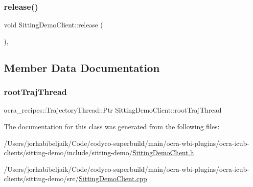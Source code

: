 \subsubsection{\texorpdfstring{release()}{release()}}
{\footnotesize\ttfamily void Sitting\+Demo\+Client\+::release (\begin{DoxyParamCaption}{ }\end{DoxyParamCaption})\hspace{0.3cm}{\ttfamily [protected]}, {\ttfamily [virtual]}}



\subsection{Member Data Documentation}
\hypertarget{classSittingDemoClient_a1d5616269e9a673022542bb86f380bfd}{}\label{classSittingDemoClient_a1d5616269e9a673022542bb86f380bfd} 
\subsubsection{\texorpdfstring{root\+Traj\+Thread}{rootTrajThread}}
{\footnotesize\ttfamily ocra\+\_\+recipes\+::\+Trajectory\+Thread\+::\+Ptr Sitting\+Demo\+Client\+::root\+Traj\+Thread\hspace{0.3cm}{\ttfamily [private]}}



The documentation for this class was generated from the following files\+:\begin{DoxyCompactItemize}
\item 
/\+Users/jorhabibeljaik/\+Code/codyco-\/superbuild/main/ocra-\/wbi-\/plugins/ocra-\/icub-\/clients/sitting-\/demo/include/sitting-\/demo/\hyperlink{SittingDemoClient_8h}{Sitting\+Demo\+Client.\+h}\item 
/\+Users/jorhabibeljaik/\+Code/codyco-\/superbuild/main/ocra-\/wbi-\/plugins/ocra-\/icub-\/clients/sitting-\/demo/src/\hyperlink{SittingDemoClient_8cpp}{Sitting\+Demo\+Client.\+cpp}\end{DoxyCompactItemize}
